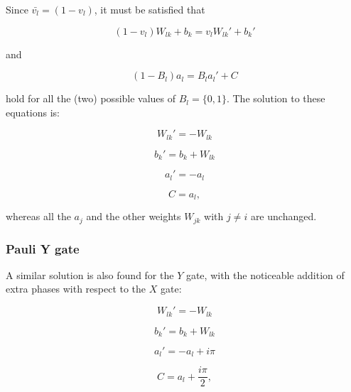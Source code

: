 Since $\bar{v_{l}} = (1-v_{l})$, it must be satisfied that

\begin{equation}
    (1-v_{l})W_{lk} + b_{k} = v_{l} W_{lk}\prime + b_{k}\prime
\end{equation}

and

\begin{equation}
   (1-B_{l}) a_{l} = B_{l} a_{l}\prime + C 
\end{equation}

hold for all the (two) possible values of $B_{l} = \{0,1\}$. The solution to these equations is:

\begin{equation}
   W_{lk}\prime = -W_{lk}
\end{equation}

\begin{equation}
   b_{k}\prime = b_{k} + W_{lk}
\end{equation}

\begin{equation}
   a_{l}\prime = -a_{l}
\end{equation}

\begin{equation}
   C = a_{l},
\end{equation}

whereas all the $a_{j}$ and the other weights $W_{jk}$ with $j \neq i$ are unchanged.

\subsubsection{Pauli Y gate}
A similar solution is also found for the $Y$ gate, with the noticeable addition of extra phases
with respect to the $X$ gate:

\begin{equation}
   W_{lk}\prime = -W_{lk}
\end{equation}

\begin{equation}
   b_{k}\prime = b_{k} + W_{lk}
\end{equation}

\begin{equation}
   a_{l}\prime = -a_{l} + i \pi
\end{equation}

\begin{equation}
   C = a_{l} + \frac{i \pi}{2},
\end{equation}

